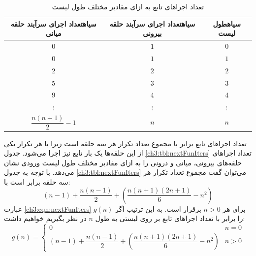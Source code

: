 \begin{table}
\begin{center}
\small
\begin{tabular}{ccc}
\toprule[0.9pt]
‌سیاه{تعداد اجرای سرآیند حلقه میانی} & ‌سیاه{تعداد اجرای سرآیند حلقه بیرونی} &  ‌سیاه{طول لیست}\\
\toprule[0.6pt]
$0$ & $1$ & $0$\\
$0$ & $1$ & $1$\\
$2$ & $2$ & $2$\\
$5$ & $3$ & $3$\\
$9$ & $4$ & $4$\\
$\vdots$ & $\vdots$ & $\vdots$\\
$\dfrac{n(n+1)}{2}-1$ & $n$ & $n$\\
\bottomrule[0.9pt]
\end{tabular}
\end{center}
\caption{تعداد اجراهای تابع {} به ازای مقادیر مختلف طول لیست}\label{ch3:tbl:lastFunIters}
\end{table}

تعداد اجراهای تابع {} برابر با مجموع تعداد تکرار هر سه حلقه است زیرا با هر تکرار یکی از این حلقه‌ها یک بار تابع {} نیز اجرا می‌شود. جدول {\eqref{ch3:tbl:nextFunIters}} تعداد اجراهای حلقه‌های بیرونی، میانی و درونی را به ازای مقادیر مختلف طول لیست ورودی نشان می‌دهد. با توجه به جدول {\eqref{ch3:tbl:nextFunIters}} می‌توان گفت مجموع تعداد تکرار هر سه حلقه برابر است با:
\begin{equation}
(n-1) + \frac{n(n-1)}{2} + \left(\frac{n(n+1)(2n+1)}{6} - n^2\right)\label{ch3:eqn:nextFunIters}
\end{equation}
عبارت {\eqref{ch3:eqn:nextFunIters}} برای هر {$n>0$} برقرار است. به این ترتیب اگر {$g(n)$} را برابر با تعداد اجراهای تابع {} بر روی لیستی به طول {$n$} در نظر بگیریم خواهیم داشت:
\begin{displaymath}
g(n)=
\begin{cases}
0 & n=0\\
(n-1) + \dfrac{n(n-1)}{2} + \left(\dfrac{n(n+1)(2n+1)}{6} - n^2\right) & n>0
\end{cases}
\end{displaymath}

